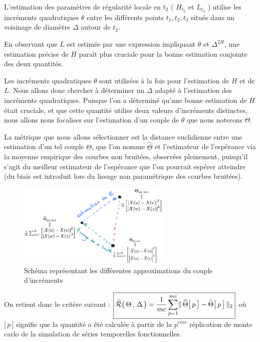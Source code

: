L'estimation des paramètres de régularité locale en $t_2$ ( $H_{t_2}$ et $L_{t_2}$ ) utilise les incréments quadratiques $\theta$ entre les différents points $t_1, t_2, t_3$ situés dans un voisinage de diamètre $\Delta$ autour de $t_2$.

En observant que $L$ est estimée par une expression impliquant $\theta$ et $\Delta^{2 H}$, une estimation précise de $H$ paraît plus cruciale pour la bonne estimation conjointe des deux quantités.


Les incréments quadratiques $\theta$ sont utilisées à la fois pour l'estimation de $H$ et de $L$. Nous allons donc chercher à déterminer un $\Delta$ adapté à l'estimation des incréments quadratiques. Puisque l'on a déterminé qu'une bonne estimation de $H$ était cruciale, et que cette quantité utilise deux valeurs d'incréments distinctes, nous allons nous focaliser sur l'estimation d'un couple de $\theta$ que nous noterons $\Theta$.

\bigskip

La métrique que nous allons sélectionner est la distance euclidienne entre une estimation d'un tel couple $\Theta$, que l'on nomme $\widehat \Theta$ et l'estimateur de l'espérance via la moyenne empirique des courbes non bruitées, observées pleinement, puisqu'il s'agit du meilleur estimateur de l'espérance que l'on pourrait espérer atteindre (du biais est introduit lors du lissage non paramétrique des courbes bruitées).

\begin{figure}[H]
	\centering
	\includegraphics[width=0.65\textwidth]{Images/sketches/theta_biais.png}
	\caption{Schéma représentant les différentes approximations du couple d'incréments}
	\label{fig:sketch_theta_biais_corpus}
\end{figure}

On retient donc le critère suivant : $\boxed{\widehat{\mathcal R} \bigl( \, \Theta \, , \, \Delta \, \bigr) = \frac 1 {mc} \sum\limits_{p=1}^{mc} \distnorme 2 {\widehat \Theta\bigl[\, p \,\bigr]} {\widetilde \Theta \bigl[ \,p \,\bigr]}}$ \; où $[\, p \,\bigr]$ signifie que la quantité a été calculée à partir de la $p^{eme}$ réplication de monte carlo de la simulation de séries temporelles fonctionnelles.